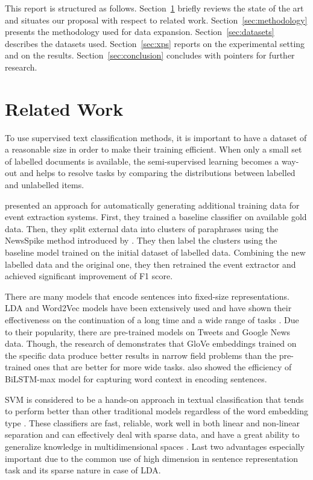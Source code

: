 \documentclass[11pt]{article}
\begin{document}
This report is structured as follows. Section~\ref{sec:relatedwork}
briefly reviews the state of the art and situates our proposal with
respect to related work.  Section~\ref{sec:methodology} presents the
methodology used for data expansion. Section~\ref{sec:datasets} describes
the datasets used. Section~\ref{sec:xps} reports on the experimental
setting and on the results. Section~\ref{sec:conclusion} concludes
with pointers for further research.

\section{Related Work}
\label{sec:relatedwork}

To use supervised text classification methods, it is important to have a dataset of a reasonable size in order to make their training efficient. When only a small set of labelled documents is available, the semi-supervised learning becomes a way-out and helps to resolve tasks by comparing the distributions between labelled and unlabelled items.

\cite{N18-2058} presented an approach for automatically generating additional training data for event extraction systems. First, they trained a baseline classifier on available gold data. Then, they split external data into clusters of paraphrases using the NewsSpike method introduced by \cite{zhang2015}. They then label the clusters using the baseline model trained on the initial dataset of labelled data. Combining the new labelled data and the original one, they then retrained the event extractor and achieved significant improvement of F1 score.

There are many models that encode sentences into fixed-size representations. LDA and Word2Vec models have been extensively used and have shown their effectiveness on the continuation of a long time and a wide range of tasks\cite{Iacobacci2016EmbeddingsFW} \cite{Jelodar2017}. Due to their popularity, there are pre-trained models on Tweets and Google News data. Though, the research of \cite{Li2018ComparisonOW} demonstrates that GloVe embeddings trained on the specific data produce better results in narrow field problems than the pre-trained ones that are better for more wide tasks. \cite{P18-1198} also showed the efficiency of BiLSTM-max model for capturing word context in encoding sentences.

SVM is considered to be a hands-on approach in textual classification \cite{SVM} that tends to perform better than other traditional models regardless of the word embedding type \cite{Li2018ComparisonOW}. These classifiers are fast, reliable, work well in both linear and non-linear separation and can effectively deal with sparse data, and have a great ability to generalize knowledge in multidimensional spaces \cite{joachims98a}. Last two advantages especially important due to the common use of high dimension in sentence representation task and its sparse nature in case of LDA.
\end{document}
